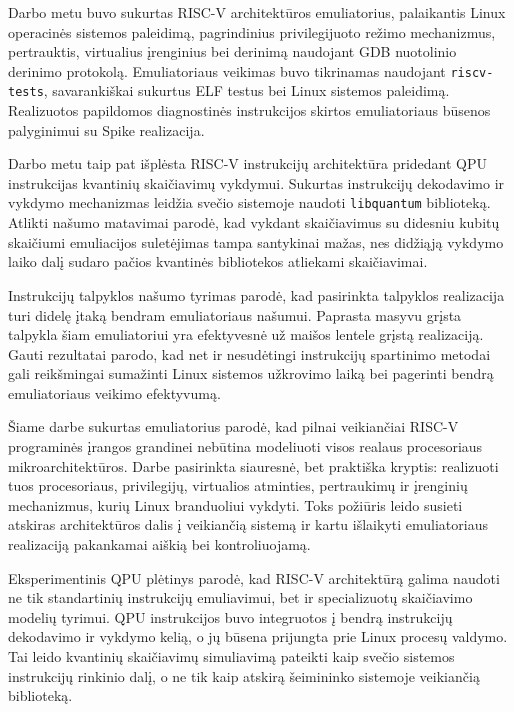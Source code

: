 Darbo metu buvo sukurtas RISC-V architektūros emuliatorius, palaikantis Linux operacinės sistemos paleidimą, pagrindinius privilegijuoto režimo mechanizmus, pertrauktis, virtualius įrenginius bei derinimą naudojant GDB nuotolinio derinimo protokolą. Emuliatoriaus veikimas buvo tikrinamas naudojant \texttt{riscv-tests}, savarankiškai sukurtus ELF testus bei Linux sistemos paleidimą. Realizuotos papildomos diagnostinės instrukcijos skirtos emuliatoriaus būsenos palyginimui su Spike realizacija.

Darbo metu taip pat išplėsta RISC-V instrukcijų architektūra pridedant QPU instrukcijas kvantinių skaičiavimų vykdymui. Sukurtas instrukcijų dekodavimo ir vykdymo mechanizmas leidžia svečio sistemoje naudoti \texttt{libquantum} biblioteką. Atlikti našumo matavimai parodė, kad vykdant skaičiavimus su didesniu kubitų skaičiumi emuliacijos suletėjimas tampa santykinai mažas, nes didžiąją vykdymo laiko dalį sudaro pačios kvantinės bibliotekos atliekami skaičiavimai.

Instrukcijų talpyklos našumo tyrimas parodė, kad pasirinkta talpyklos realizacija turi didelę įtaką bendram emuliatoriaus našumui. Paprasta masyvu grįsta talpykla šiam emuliatoriui yra efektyvesnė už maišos lentele grįstą realizaciją. Gauti rezultatai parodo, kad net ir nesudėtingi instrukcijų spartinimo metodai gali reikšmingai sumažinti Linux sistemos užkrovimo laiką bei pagerinti bendrą emuliatoriaus veikimo efektyvumą.


Šiame darbe sukurtas emuliatorius parodė, kad pilnai veikiančiai RISC-V programinės įrangos grandinei nebūtina modeliuoti visos realaus procesoriaus mikroarchitektūros. Darbe pasirinkta siauresnė, bet praktiška kryptis: realizuoti tuos procesoriaus, privilegijų, virtualios atminties, pertraukimų ir įrenginių mechanizmus, kurių Linux branduoliui vykdyti. Toks požiūris leido susieti atskiras architektūros dalis į veikiančią sistemą ir kartu išlaikyti emuliatoriaus realizaciją pakankamai aiškią bei kontroliuojamą.

Eksperimentinis QPU plėtinys parodė, kad RISC-V architektūrą galima naudoti ne tik standartinių instrukcijų emuliavimui, bet ir specializuotų skaičiavimo modelių tyrimui. QPU instrukcijos buvo integruotos į bendrą instrukcijų dekodavimo ir vykdymo kelią, o jų būsena prijungta prie Linux procesų valdymo. Tai leido kvantinių skaičiavimų simuliavimą pateikti kaip svečio sistemos instrukcijų rinkinio dalį, o ne tik kaip atskirą šeimininko sistemoje veikiančią biblioteką.

